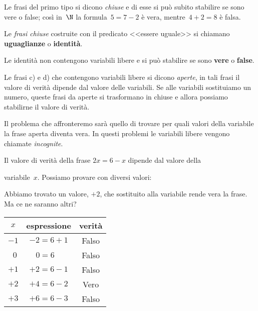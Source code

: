 Le frasi del primo tipo si dicono \emph{chiuse}  e
di esse si può subito stabilire se sono vere o false; così in~\(\N\) la
formula~\(5 = 7 - 2\) è vera, mentre~\(4 + 2 = 8\) è falsa.

\begin{definizione}{}{} 
Le \emph{frasi chiuse} costruite con il predicato
<<essere uguale>> si chiamano \textbf{uguaglianze} o \textbf{identità}.
\end{definizione}

Le identità non contengono variabili libere e si può stabilire se sono 
\textbf{vere} o \textbf{false}.

% 

Le frasi c) e d) che contengono variabili libere si dicono \emph{aperte}, 
in tali frasi il valore di verità dipende dal valore delle variabili.
Se alle variabili sostituiamo un numero, queste frasi da aperte si 
trasformano in chiuse e allora possiamo stabilirne il valore di verità.

Il problema che affronteremo sarà quello di trovare per quali valori della 
variabile la frase aperta diventa vera.
In questi problemi le variabili libere vengono chiamate \emph{incognite}.

\begin{esempio}{}{}
Il valore di verità della frase \(2x = 6 - x\) dipende dal valore della 

{
variabile~\(x\). 
Possiamo provare con diversi valori: 

\vspace{.5em}
Abbiamo trovato un valore, \(+2\), che sostituito alla variabile rende vera 
la frase.
Ma ce ne saranno altri?
}{
\begin{center}
\begin{tabular}{ccc}
\(x\) & espressione & verità\\
\hline
\(-1\) & \(-2 = 6 +1\) & Falso\\
\(~~0\) & \(0 = 6~~~~ \) & Falso\\
\(+1\) & \(+2 = 6 - 1\) & Falso\\
\(+2\) & \(+4 = 6 - 2\) & Vero\\
\(+3\) & \(+6 = 6 - 3\) & Falso\\
\end{tabular}
\end{center}
}
\end{esempio}

